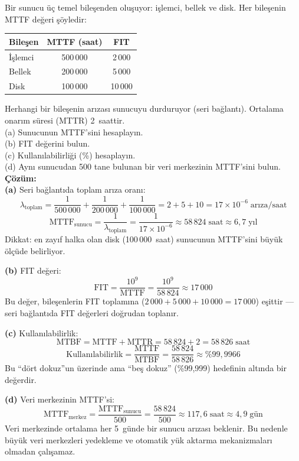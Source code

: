 \begin{ornek}[1.7]
Bir sunucu üç temel bileşenden oluşuyor: işlemci, bellek ve disk. Her bileşenin MTTF değeri şöyledir:
\begin{center}
\small
\begin{tabular}{@{}lcc@{}}
\toprule
\textbf{Bileşen} & \textbf{MTTF (saat)} & \textbf{FIT} \\
\midrule
İşlemci  & 500\,000 & 2\,000 \\
Bellek   & 200\,000 & 5\,000 \\
Disk     & 100\,000 & 10\,000 \\
\bottomrule
\end{tabular}
\end{center}

\noindent Herhangi bir bileşenin arızası sunucuyu durduruyor (seri bağlantı). Ortalama onarım süresi (MTTR) 2~saattir.\\[4pt]
(a) Sunucunun MTTF'sini hesaplayın.\\
(b) FIT değerini bulun.\\
(c) Kullanılabilirliği (\%) hesaplayın.\\
(d) Aynı sunucudan 500 tane bulunan bir veri merkezinin MTTF'sini bulun.\\[6pt]
\textbf{Çözüm:}\\[2pt]
\textbf{(a)} Seri bağlantıda toplam arıza oranı:
\[
\lambda_{\text{toplam}} = \frac{1}{500\,000} + \frac{1}{200\,000} + \frac{1}{100\,000} = 2 + 5 + 10 = 17 \times 10^{-6}\;\text{arıza/saat}
\]
\[
\text{MTTF}_{\text{sunucu}} = \frac{1}{\lambda_{\text{toplam}}} = \frac{1}{17 \times 10^{-6}} \approx 58\,824\;\text{saat} \approx 6{,}7\;\text{yıl}
\]
Dikkat: en zayıf halka olan disk (100\,000~saat) sunucunun MTTF'sini büyük ölçüde belirliyor.

\textbf{(b)} FIT değeri:
\[
\text{FIT} = \frac{10^9}{\text{MTTF}} = \frac{10^9}{58\,824} \approx 17\,000
\]
Bu değer, bileşenlerin FIT toplamına ($2\,000 + 5\,000 + 10\,000 = 17\,000$) eşittir --- seri bağlantıda FIT değerleri doğrudan toplanır.

\textbf{(c)} Kullanılabilirlik:
\[
\text{MTBF} = \text{MTTF} + \text{MTTR} = 58\,824 + 2 = 58\,826\;\text{saat}
\]
\[
\text{Kullanılabilirlik} = \frac{\text{MTTF}}{\text{MTBF}} = \frac{58\,824}{58\,826} \approx \%99{,}9966
\]
Bu ``dört dokuz''un üzerinde ama ``beş dokuz'' (\%99,999) hedefinin altında bir değerdir.

\textbf{(d)} Veri merkezinin MTTF'si:
\[
\text{MTTF}_{\text{merkez}} = \frac{\text{MTTF}_{\text{sunucu}}}{500} = \frac{58\,824}{500} \approx 117{,}6\;\text{saat} \approx 4{,}9\;\text{gün}
\]
Veri merkezinde ortalama her 5~günde bir sunucu arızası beklenir. Bu nedenle büyük veri merkezleri yedekleme ve otomatik yük aktarma mekanizmaları olmadan çalışamaz.
\end{ornek}

